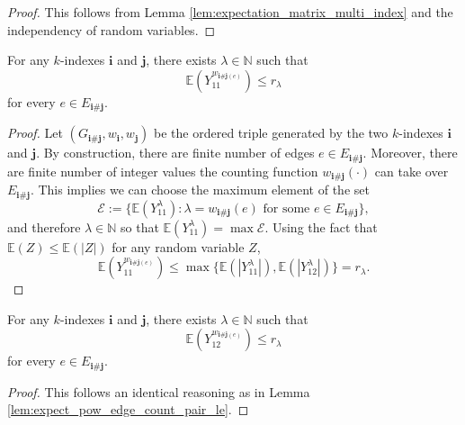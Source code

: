 \begin{proof}
  This follows from Lemma \ref{lem:expectation_matrix_multi_index} and the independency of random variables.
\end{proof}


\begin{lemma}
  \notready
  \label{lem:expect_pow_edge_count_pair_le}
  For any $k$-indexes $\mathbf{i}$ and $\mathbf{j}$, there exists $\lambda \in \mathbb{N}$ such that
  \[
  \mathbb{E} (Y_{11}^{w_{\mathbf{i} \# \mathbf{j} (e)}}) \leq r_\lambda
  \]
  for every $e \in E_{\mathbf{i} \# \mathbf{j}}$.
\end{lemma}

\begin{proof}
  Let $(G_{\mathbf{i}\#\mathbf{j}},w_\mathbf{i},w_\mathbf{j})$ be the ordered triple generated by the two $k$-indexes $\mathbf{i}$ and $\mathbf{j}$.
  By construction, there are finite number of edges $e \in E_{\mathbf{i} \# \mathbf{j}}$.
  Moreover, there are finite number of integer values the counting function $w_{\mathbf{i} \# \mathbf{j}}(\cdot)$ can take over $E_{\mathbf{i} \# \mathbf{j}}$.
  This implies we can choose the maximum element of the set
  \[
  \mathscr{E} := \{ \mathbb{E} (Y_{11}^\lambda) : \lambda = w_{\mathbf{i} \# \mathbf{j}}(e) \text{ for some } e \in E_{\mathbf{i} \# \mathbf{j}} \},
  \]
  and therefore $\lambda \in \mathbb{N}$ so that $\mathbb{E}(Y_{11}^\lambda) = \max \mathscr{E}$.
  Using the fact that $\mathbb{E}(Z) \leq \mathbb{E}(|Z|)$ for any random variable $Z$,
  \[
  \mathbb{E} (Y_{11}^{w_{\mathbf{i} \# \mathbf{j} (e)}}) \leq \max\{ \mathbb{E}(|Y_{11}^\lambda|), \mathbb{E}(|Y_{12}^\lambda|) \} = r_\lambda.
  \]
\end{proof}


\begin{lemma}
  \notready
  \label{lem:expect_pow_edge_count_pair_le_off}
  For any $k$-indexes $\mathbf{i}$ and $\mathbf{j}$, there exists $\lambda \in \mathbb{N}$ such that
  \[
  \mathbb{E} (Y_{12}^{w_{\mathbf{i} \# \mathbf{j} (e)}}) \leq r_\lambda
  \]
  for every $e \in E_{\mathbf{i} \# \mathbf{j}}$.
\end{lemma}

\begin{proof}
  This follows an identical reasoning as in Lemma \ref{lem:expect_pow_edge_count_pair_le}.
\end{proof}


